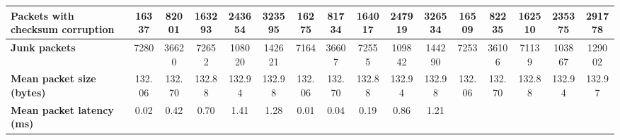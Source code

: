 \begin{table}[!h]
{\begin{tabular}{|l|ccccc|ccccc|ccccc|}
            \\ \hline
            \textbf{Packets with checksum corruption} & \multicolumn{1}{c|}{16337} & \multicolumn{1}{c|}{82001}
            & \multicolumn{1}{c|}{163293}
            & \multicolumn{1}{c|}{243654}
            & \multicolumn{1}{c|}{323595}
            & \multicolumn{1}{c|}{16275}
            & \multicolumn{1}{c|}{81734}
            & \multicolumn{1}{c|}{164017}
            & \multicolumn{1}{c|}{247919}
            & \multicolumn{1}{c|}{326534}
            & \multicolumn{1}{c|}{16509}
            & \multicolumn{1}{c|}{82235}
            & \multicolumn{1}{c|}{162510}
            & \multicolumn{1}{c|}{235375}
            & \multicolumn{1}{c|}{291778}
            \\ \hline
            \textbf{Junk packets} & \multicolumn{1}{c|}{7280} & \multicolumn{1}{c|}{36620}
            & \multicolumn{1}{c|}{72652}
            & \multicolumn{1}{c|}{108020}
            & \multicolumn{1}{c|}{142621}
            & \multicolumn{1}{c|}{7164}
            & \multicolumn{1}{c|}{36607}
            & \multicolumn{1}{c|}{72555}
            & \multicolumn{1}{c|}{109842}
            & \multicolumn{1}{c|}{144290}
            & \multicolumn{1}{c|}{7253}
            & \multicolumn{1}{c|}{36106}
            & \multicolumn{1}{c|}{71139}
            & \multicolumn{1}{c|}{103867}
            & \multicolumn{1}{c|}{129002}
            \\ \hline
            \textbf{Mean packet size (bytes)} & \multicolumn{1}{c|}{132.06} & \multicolumn{1}{c|}{132.70}
            & \multicolumn{1}{c|}{132.88}
            & \multicolumn{1}{c|}{132.94}
            & \multicolumn{1}{c|}{132.98}
            & \multicolumn{1}{c|}{132.06}
            & \multicolumn{1}{c|}{132.70}
            & \multicolumn{1}{c|}{132.88}
            & \multicolumn{1}{c|}{132.94}
            & \multicolumn{1}{c|}{132.98}
            & \multicolumn{1}{c|}{132.06}
            & \multicolumn{1}{c|}{132.70}
            & \multicolumn{1}{c|}{132.88}
            & \multicolumn{1}{c|}{132.94}
            & \multicolumn{1}{c|}{132.97}
            \\ \hline
            \textbf{Mean packet latency (ms)} & \multicolumn{1}{c|}{0.02} & \multicolumn{1}{c|}{0.42}
            & \multicolumn{1}{c|}{0.70}
            & \multicolumn{1}{c|}{1.41}
            & \multicolumn{1}{c|}{1.28}
            & \multicolumn{1}{c|}{0.01}
            & \multicolumn{1}{c|}{0.04}
            & \multicolumn{1}{c|}{0.19}
            & \multicolumn{1}{c|}{0.86}
            & \multicolumn{1}{c|}{1.21}

\end{tabular}}
\end{table}
